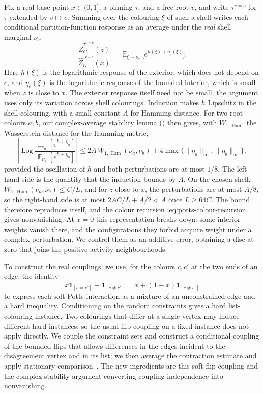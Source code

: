 \documentclass[11pt,reqno]{article}
\theoremstyle{plain}
\theoremstyle{definition}
\theoremstyle{remark}
\theoremstyle{definition}
\theoremstyle{remark}
\newcommand{\Log}{\operatorname{Log}}          %
\newcommand{\one}[1]{\mathbf{1}_{\left[#1\right]}}   %
\DeclareMathOperator{\E}{\mathbb{E}}
\DeclareMathOperator{\Ham}{Ham}
\newcommand{\WHam}{W_{1,\Ham}}                   %
\newcommand{\nZpin}[2]{\widehat Z_{#1}^{#2}}
\begin{document}
Fix a real base point \(x\in(0,1]\), a pinning \(\tau\), and a free root
\(v\), and write \(\tau^{v=c}\) for \(\tau\) extended by \(v\mapsto c\).
Summing over the colouring \(\xi\) of such a shell writes each
conditional partition-function response as an average under the
\emph{real} shell marginal \(\nu_c\):
\[
  \frac{\nZpin{G}{\tau^{v=c}}(z)}{\nZpin{G}{\tau^{v=c}}(x)}
  =\E_{\xi\sim\nu_c}\bigl[e^{h(\xi)+\eta_c(\xi)}\bigr].
\]
Here \(h(\xi)\) is the logarithmic response of the exterior, which does
not depend on \(c\), and \(\eta_c(\xi)\) is the logarithmic response of
the bounded interior, which is small when \(z\) is close to \(x\).  The
exterior response itself need not be small; the argument uses only its
variation across shell colourings.  Induction makes
\(h\) Lipschitz in the shell colouring, with a small constant \(A\) for
Hamming distance.  For two root colours \(a,b\), our complex-average
stability lemma () then gives, with \(\WHam\) the
Wasserstein distance for the Hamming metric,
\[
  \left|\Log\frac{\E_{\nu_a}[e^{h+\eta_a}]}{\E_{\nu_b}[e^{h+\eta_b}]}\right|
  \le2A\,\WHam(\nu_a,\nu_b)
     +4\max\bigl\{\|\eta_a\|_\infty,\|\eta_b\|_\infty\bigr\},
\]
provided the oscillation of \(h\) and both perturbations are at most
\(1/8\).  The left-hand side is the quantity that the induction bounds by
\(A\).  On the chosen shell, \(\WHam(\nu_a,\nu_b)\le C/L\), and for \(z\)
close to \(x\), the perturbations are at most \(A/8\), so the right-hand
side is at most \(2AC/L+A/2<A\) once \(L\ge64C\).  The bound therefore
reproduces itself, and the colour recursion
\eqref{eq:potts-colour-recursion} gives nonvanishing.  At
\(x=0\) this representation breaks down: some interior weights vanish
there, and the configurations they forbid acquire weight under a complex
perturbation.  We control them as an additive error, obtaining a disc at
zero that joins the positive-activity neighbourhoods.

To construct the real couplings, we use, for the colours \(c,c'\) at the
two ends of an edge, the identity
\[
  x\one{c=c'}+\one{c\ne c'}=x+(1-x)\one{c\ne c'}
\]
to express each soft Potts interaction as a mixture of an unconstrained
edge and a hard inequality.  Conditioning on the random constraints
gives a hard list-colouring instance.  Two colourings that differ at a
single vertex may induce different hard instances, so the usual flip
coupling on a fixed instance does not apply directly.  We couple the
constraint sets and construct a conditional coupling of the bounded
flips that allows differences in the edges incident to the disagreement
vertex and in its list; we then average the contraction estimate and
apply stationary comparison~\cite[Lemma~19]{CFFGZZ2024}.  The new ingredients
are this soft flip coupling and the complex stability argument
converting coupling independence into nonvanishing.
\end{document}
